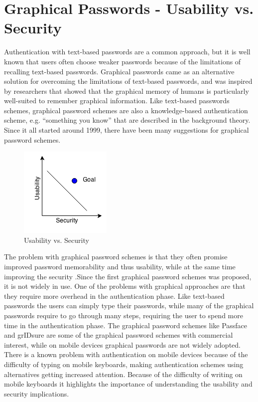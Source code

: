 \section{Graphical Passwords - Usability vs. Security}

    Authentication with text-based passwords are a common approach, but it is well known that users often choose weaker passwords because of the limitations of recalling text-based passwords. Graphical passwords came as an alternative solution for overcoming the limitations of text-based passwords, and was inspired by researchers that showed that the graphical memory of humans is particularly well-suited to remember graphical information. 
    Like text-based passwords schemes, graphical password schemes are also a knowledge-based authentication scheme, e.g. ``something you know'' that are described in the background theory. Since it all started around 1999, there have been many suggestions for graphical password schemes. 

    \begin{figure}
      \vspace{-20pt}
      \begin{center}
        \includegraphics[scale=0.7]{pics/UsabilityVsSecurity.png}
      \end{center}
      \vspace{-20pt}
      \caption{Usability vs. Security}
      \vspace{-10pt}
    \end{figure}

    The problem with graphical password schemes is that they often promise improved password memorability and thus usability, while at the same time improving the security \cite{Biddle}.Since the first graphical password schemes was proposed, it is not widely in use. One of the problems with graphical approaches are that they require more overhead in the authentication phase. Like text-based passwords the users can simply type their passwords, while many of the graphical passwords require to go through many steps, requiring the user to spend more time in the authentication phase. The graphical password schemes like Passface and grIDsure are some of the graphical password schemes with commercial interest, while on mobile devices graphical passwords are not widely adopted. There is a known problem with authentication on mobile devices because of the difficulty of typing on mobile keyboards, making authentication schemes using alternatives getting increased attention. Because of the difficulty of writing on mobile keyboards it highlights the importance of understanding the usability and security implications.

